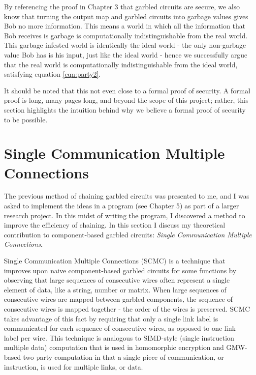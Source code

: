 By referencing the proof in Chapter 3 that garbled circuits are secure, we also know that turning the output map and garbled circuits into garbage values gives Bob no more information.
This means a world in which all the information that Bob receives is garbage is computationally indistinguishable from the real world.
This garbage infested world is identically the ideal world - the only non-garbage value Bob has is his input, just like the ideal world - hence we successfully argue that the real world is computationally indistinguishable from the ideal world, satisfying equation \ref{eqn:party2}. 

It should be noted that this not even close to a formal proof of security.
A formal proof is long, many pages long, and beyond the scope of this project; rather, this section highlights the intuition behind why we believe a formal proof of security to be possible. 

\section{Single Communication Multiple Connections}

The previous method of chaining garbled circuits was presented to me, and I was asked to implement the ideas in a program (see Chapter 5) as part of a larger research project. 
In this midst of writing the program, I discovered a method to improve the efficiency of chaining. 
In this section I discuss my theoretical contribution to component-based garbled circuits:  \textit{Single Communication Multiple Connections}.

Single Communication Multiple Connections (SCMC) is a technique that improves upon naive component-based garbled circuits for some functions by observing that large sequences of consecutive wires often represent a single element of data, like a string, number or matrix. 
When large sequences of consecutive wires are mapped between garbled components, the sequence of consecutive wires is mapped together - the order of the wires is preserved. 
SCMC takes advantage of this fact by requiring that only a single link label is communicated for each sequence of consecutive wires, as opposed to one link label per wire. 
This technique is analogous to SIMD-style (single instruction multiple data) computation that is used in homomorphic encryption \cite{SV11} and GMW-based two party computation \cite{DSZ15, SZ13} in that a single piece of communication, or instruction, is used for multiple links, or data. 

